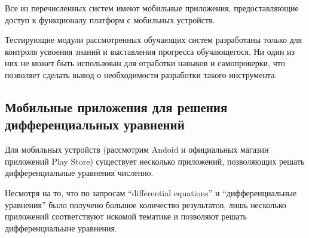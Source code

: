 \documentclass[14pt,russian]{extarticle}
\begin{document}
Все из перечисленных систем имеют мобильные приложения, предоставляющие доступ к функционалу платформ с мобильных устройств.

Тестирующие модули рассмотренных обучающих систем разработаны только для контроля усвоения знаний и выставления прогресса обучающегося. Ни один из них не может быть использован для отработки навыков и самопроверки, что позволяет сделать вывод о необходимости разработки такого инструмента.

\subsection{Мобильные приложения для решения дифференциальных уравнений}

Для мобильных устройств (рассмотрим Andoid и официальных магазин приложений Play Store) существует несколько приложений, позволяющих решать дифференциальные уравнения численно.

Несмотря на то, что по запросам \enquote{differential equations} и \enquote{дифференциальные уравнения} было получено большое количество результатов, лишь несколько приложений соответствуют искомой тематике и позволяют решать дифференциальыне уравнения.
\end{document}
